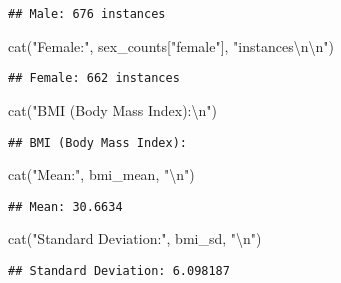 \documentclass[
]{article}
\newenvironment{Shaded}{\begin{snugshade}}{\end{snugshade}}
\newcommand{\FunctionTok}[1]{\textcolor[rgb]{0.00,0.00,0.00}{#1}}
\newcommand{\NormalTok}[1]{#1}
\newcommand{\SpecialCharTok}[1]{\textcolor[rgb]{0.00,0.00,0.00}{#1}}
\newcommand{\StringTok}[1]{\textcolor[rgb]{0.31,0.60,0.02}{#1}}
\begin{document}
\begin{verbatim}
## Male: 676 instances
\end{verbatim}

\begin{Shaded}
\begin{Highlighting}[]
\FunctionTok{cat}\NormalTok{(}\StringTok{"Female:"}\NormalTok{, sex\_counts[}\StringTok{"female"}\NormalTok{], }\StringTok{"instances}\SpecialCharTok{\textbackslash{}n\textbackslash{}n}\StringTok{"}\NormalTok{)}
\end{Highlighting}
\end{Shaded}

\begin{verbatim}
## Female: 662 instances
\end{verbatim}

\begin{Shaded}
\begin{Highlighting}[]
\FunctionTok{cat}\NormalTok{(}\StringTok{"BMI (Body Mass Index):}\SpecialCharTok{\textbackslash{}n}\StringTok{"}\NormalTok{)}
\end{Highlighting}
\end{Shaded}

\begin{verbatim}
## BMI (Body Mass Index):
\end{verbatim}

\begin{Shaded}
\begin{Highlighting}[]
\FunctionTok{cat}\NormalTok{(}\StringTok{"Mean:"}\NormalTok{, bmi\_mean, }\StringTok{"}\SpecialCharTok{\textbackslash{}n}\StringTok{"}\NormalTok{)}
\end{Highlighting}
\end{Shaded}

\begin{verbatim}
## Mean: 30.6634
\end{verbatim}

\begin{Shaded}
\begin{Highlighting}[]
\FunctionTok{cat}\NormalTok{(}\StringTok{"Standard Deviation:"}\NormalTok{, bmi\_sd, }\StringTok{"}\SpecialCharTok{\textbackslash{}n}\StringTok{"}\NormalTok{)}
\end{Highlighting}
\end{Shaded}

\begin{verbatim}
## Standard Deviation: 6.098187
\end{verbatim}
\end{document}

